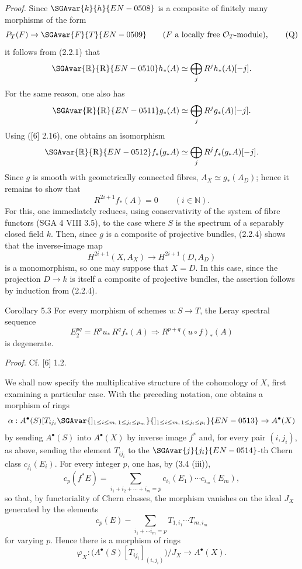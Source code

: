 \emph{Proof.} Since $\SGAvar{k}{h}{EN-0508}$ is a composite of finitely many morphisms of the form
\[
P_T(F)\to \SGAvar{F}{T}{EN-0509}\qquad(F\text{ a locally free }\mathcal O_T\text{-module}),
\tag{Q}
\]
it follows from (2.2.1) that
\[
\SGAvar{\mathbb{R}}{\mathrm R}{EN-0510}h_*(A)\simeq\bigoplus_j R^jh_*(A)[-j].
\]
For the same reason, one also has
\[
\SGAvar{\mathbb{R}}{\mathrm R}{EN-0511}g_*(A)\simeq\bigoplus_j R^jg_*(A)[-j].
\]
Using ([6] 2.16), one obtains an isomorphism
\[
\SGAvar{\mathbb{R}}{\mathrm R}{EN-0512}f_*(g_*A)\simeq\bigoplus_j R^j f_*(g_*A)[-j].
\]
Since $g$ is smooth with geometrically connected fibres, $A_X\simeq g_*(A_D)$; hence it remains to show that
\[
R^{2i+1}f_*(A)=0\qquad (i\in\mathbb N).
\tag{5.2.1}
\]
For this, one immediately reduces, using conservativity of the system of fibre functors (SGA 4 VIII 3.5), to the case where $S$ is the spectrum of a separably closed field $k$. Then, since $g$ is a composite of projective bundles, (2.2.4) shows that the inverse-image map
\[
H^{2i+1}(X,A_X)\to H^{2i+1}(D,A_D)
\]
is a monomorphism, so one may suppose that $X=D$. In this case, since the projection $D\to k$ is itself a composite of projective bundles, the assertion follows by induction from (2.2.4).

\begin{statement}{Corollary 5.3}
For every morphism of schemes $u:S\to T$, the Leray spectral sequence
\[
E_2^{pq}=R^p u_*\,R^q f_*(A)\Rightarrow R^{p+q}(u\circ f)_*(A)
\]
is degenerate.
\end{statement}

\emph{Proof.} Cf. [6] 1.2.

We shall now specify the multiplicative structure of the cohomology of $X$, first examining a particular case. With the preceding notation, one obtains a morphism of rings
\[
\alpha:A^{\bullet}(S)[T_{ij_i}\SGAvar{]_{1\le i\le m,\,1\le j_i\le p_m}}{]_{1\le i\le m,\,1\le j_i\le p_i}}{EN-0513}\to A^{\bullet}(X)
\]
by sending $A^{\bullet}(S)$ into $A^{\bullet}(X)$ by inverse image $f^*$ and, for every pair $(i,j_i)$, as above, sending the element $T_{ij_i}$ to the $\SGAvar{j}{j_i}{EN-0514}$-th Chern class $c_{j_i}(E_i)$. For every integer $p$, one has, by (3.4 (iii)),
\[
c_p(f^*E)=\sum_{i_1+i_2+\cdots+i_m=p}c_{i_1}(E_1)\cdots c_{i_m}(E_m),
\]
so that, by functoriality of Chern classes, the morphism vanishes on the ideal $J_X$ generated by the elements
\[
c_p(E)-\sum_{i_1+\cdots i_m=p}T_{1,i_1}\cdots T_{m,i_m}
\]
for varying $p$. Hence there is a morphism of rings
\[
\varphi_X:\bigl(A^{\bullet}(S)[T_{ij_i}]_{(i,j_i)}\bigr)/J_X\to A^{\bullet}(X).
\]

